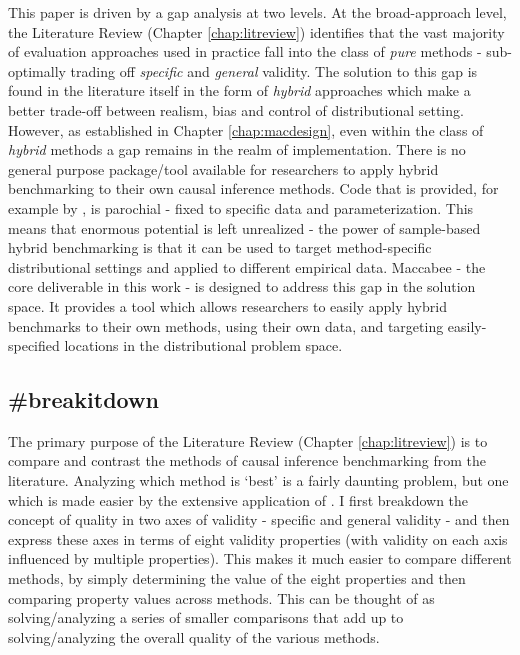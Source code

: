 \documentclass[./main.tex]{subfiles}
\begin{document}
This paper is driven by a gap analysis at two levels. At the broad-approach level, the Literature Review (Chapter \ref{chap:litreview}) identifies that the vast majority of evaluation approaches used in practice fall into the class of \textit{pure} methods - sub-optimally trading off \textit{specific} and \textit{general} validity. The solution to this gap is found in the literature itself in the form of \textit{hybrid} approaches which make a better trade-off between realism, bias and control of distributional setting. However, as established in Chapter \ref{chap:macdesign}, even within the class of \textit{hybrid} methods a gap remains in the realm of implementation. There is no general purpose package/tool available for researchers to apply hybrid benchmarking to their own causal inference methods. Code that is provided, for example by \textcite{Dorie2019Automated1}, is parochial - fixed to specific data and parameterization. This means that enormous potential is left unrealized - the power of sample-based hybrid benchmarking is that it can be used to target method-specific distributional settings and applied to different empirical data. Maccabee - the core deliverable in this work - is designed to address this gap in the solution space. It provides a tool which allows researchers to easily apply hybrid benchmarks to their own methods, using their own data, and targeting easily-specified locations in the distributional problem space.


\subsection{\textbf{\#breakitdown}}
\label{hc:breakitdown}

The primary purpose of the Literature Review (Chapter \ref{chap:litreview}) is to compare and contrast the methods of causal inference benchmarking from the literature. Analyzing which method is `best' is a fairly daunting problem, but one which is made easier by the extensive application of . I first breakdown the concept of quality in two axes of validity - specific and general validity - and then express these axes in terms of eight validity properties (with validity on each axis influenced by multiple properties). This makes it much easier to compare different methods, by simply determining the value of the eight properties and then comparing property values across methods. This can be thought of as solving/analyzing a series of smaller comparisons that add up to solving/analyzing the overall quality of the various methods.
\end{document}
